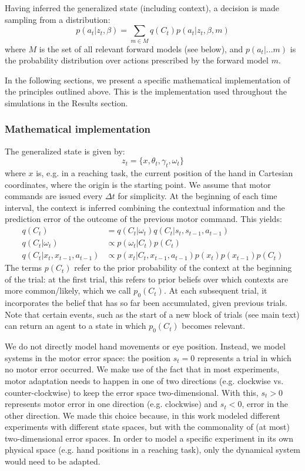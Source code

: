 \documentclass[a4paper,doc,floatsintext,natbib]{apa6}
\begin{document}
Having inferred the generalized state (including context), a decision is made
sampling from a distribution:
\begin{equation}
p(a_t | z_t, \beta) = \displaystyle\sum_{m \in M}q(C_t)p(a_t | z_t, \beta, m)
\end{equation}
where $M$ is the set of all relevant forward models (see below), and
$p(a_t | ... m)$ is the probability distribution over actions prescribed by the
forward model $m$.

In the following sections, we present a specific mathematical implementation
of the principles outlined above. This is the implementation used throughout the
simulations in the Results section.

\subsubsection{Mathematical implementation}
The generalized state is given by:
\begin{equation}
z_t = \{x, \theta_t, \gamma_t, \omega_t\}
\end{equation}
where $x$ is, e.g. in a reaching task, the current position of the hand in
Cartesian coordinates, where the origin is the starting point. We assume that
motor commands are issued every $\Delta t$ for simplicity. At the beginning of
each time interval, the context is inferred combining the contextual
information and the prediction error of the outcome of the previous motor
command. This yields:
\begin{align}
  q(C_t) &= q(C_t | \omega_t)q(C_t | s_t, s_{t-1}, a_{t-1}) \\ \label{eqn:estimated-context}
  q(C_t | \omega_t) &\propto p(\omega_t | C_t)p(C_t) \\
  q(C_t | x_t, x_{t-1}, a_{t-1}) &\propto p(x_t | C_t, x_{t-1}, a_{t-1})p(x_t)p(x_{t-1})p(C_t)
\end{align}
The terms $p(C_t)$ refer to the prior probability of the context at the
beginning of the trial: at the first trial, this refers to prior beliefs over
which contexts are more common/likely, which we call $p_0(C_t)$. At each
subsequent trial, it incorporates the belief that has so far been accumulated,
given previous trials. Note that certain events, such as the start of a new
block of trials (see main text) can return an agent to a state in which
$p_0(C_t)$ becomes relevant.

We do not directly model hand movements or eye position. Instead, we model
systems in the motor error space: the position $s_t = 0$ represents a trial in
which no motor error occurred. We make use of the fact that in most
experiments, motor adaptation needs to happen in one of two directions
(e.g. clockwise vs. counter-clockwise) to keep the error space
two-dimensional. With this, $s_t > 0$ represents motor error in one direction
(e.g. clockwise) and $s_t < 0$, error in the other direction. We made this
choice because, in this work modeled different experiments with
different state spaces, but with the commonality of (at most)
two-dimensional error spaces. In order to model a specific experiment in its
own physical space (e.g. hand positions in a reaching task), only the dynamical
system would need to be adapted.
\end{document}
